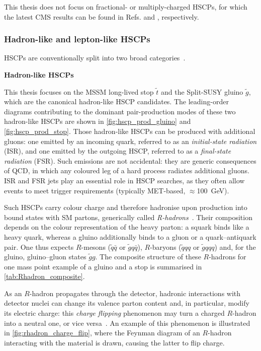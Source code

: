 This thesis does not focus on fractional- or multiply-charged HSCPs, for which the latest CMS results can be found in Refs. \cite{PhysRevLett.134.131802} and \cite{MCP_status}, respectively.


\subsubsection{Hadron-like and lepton-like HSCPs}

HSCPs are conventionally split into two broad categories~\cite{Fairbairn:2006gg}.

\vspace{0.5 cm}
\noindent \textbf{Hadron-like HSCPs}
\vspace{0.5 cm}

This thesis focuses on the MSSM long-lived stop $\tilde{t}$ and the Split-SUSY gluino $\tilde{g}$, which are the canonical hadron-like HSCP candidates. The leading-order diagrams contributing to the dominant pair-production modes of these two hadron-like HSCPs are shown in \cref{fig:hscp_prod_gluino} and \cref{fig:hscp_prod_stop}. Those hadron-like HSCPs can be produced with additional gluons: one emitted by an incoming quark, referred to as an \textit{initial-state radiation} (ISR), and one emitted by the outgoing HSCP, referred to as a \textit{final-state radiation} (FSR). Such emissions are not accidental: they are generic consequences of QCD, in which any coloured leg of a hard process radiates additional gluons. ISR and FSR jets play an essential role in HSCP searches, as they often allow events to meet trigger requirements (typically MET-based, $\approx$100~GeV).

Such HSCPs carry colour charge and therefore hadronise upon production into bound states with SM partons, generically called \textit{R-hadrons}~\cite{Fairbairn:2006gg}. Their composition depends on the colour representation of the heavy parton: a squark binds like a heavy quark, whereas a gluino additionally binds to a gluon or a quark--antiquark pair. One thus expects $R$-mesons ($\tilde{q}\bar{q}$ or $\tilde{g}q\bar{q}$), $R$-baryons ($\tilde{q}qq$ or $\tilde{g}qqq$) and, for the gluino, gluino--gluon states $\tilde{g}g$. The composite structure of these $R$-hadrons for one mass point example of a gluino and a stop is summarised in \cref{tab:Rhadron_composite}.

As an $R$-hadron propagates through the detector, hadronic interactions with detector nuclei can change its valence parton content and, in particular, modify its electric charge: this \textit{charge flipping} phenomenon may turn a charged $R$-hadron into a neutral one, or vice versa~\cite{Mackeprang:2009ad}. An example of this phenomenon is illustrated in \cref{fig:rhadron_charge_flip}, where the Feynman diagram of an $R$-hadron interacting with the material is drawn, causing the latter to flip charge.

